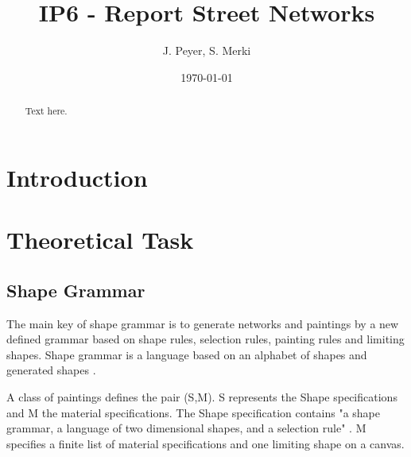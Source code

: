 \documentclass[11pt, a4paper]{report}
\begin{document}
\begin{titlepage}
    \title{IP6 - Report Street Networks}
    \date{\today}
    \author{J. Peyer, S. Merki}
    \maketitle
\end{titlepage}
\setcounter{page}{1}

\tableofcontents



\begin{abstract}
    Text here.
\end{abstract}

\chapter{Introduction}

\chapter{Theoretical Task}
\section{Shape Grammar}
The main key of shape grammar is to generate networks and paintings by a new defined grammar based on shape rules, selection rules, painting rules and limiting shapes. Shape grammar is a language based on an alphabet of shapes and generated shapes \citep{shapeGrammars:1972}. 

A class of paintings defines the pair (S,M). S represents the Shape specifications and M the material specifications. The Shape specification contains "a shape grammar, a language of two dimensional shapes, and a selection rule" \citep{shapeGrammars:1972}. M specifies a finite list of material specifications and one limiting shape on a canvas.
\end{document}
